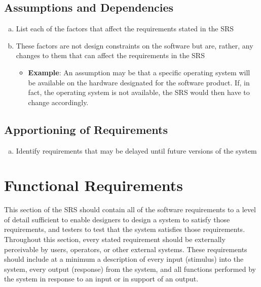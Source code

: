 \documentclass[]{article}
\begin{document}
\subsection{Assumptions and Dependencies}
\label{sub:assumptions_and_dependencies}
\begin{enumerate}[a)]
	\item List each of the factors that affect the requirements stated in the SRS
	\item These factors are not design constraints on the software but are, rather, any changes to them that can affect the requirements in the SRS
	\begin{itemize}
		\item \textbf{Example}: An assumption may be that a specific operating system will be available on the hardware designated for the software product. If, in fact, the operating system is not available, the SRS would then have to change accordingly.
	\end{itemize}
\end{enumerate}

\subsection{Apportioning of Requirements}
\label{sub:apportioning_of_requirements}
\begin{enumerate}[a)]
	\item Identify requirements that may be delayed until future versions of the system
\end{enumerate}


\section{Functional Requirements}
\label{sec:functional_requirements}
This section of the SRS should contain all of the software requirements to a level of detail sufficient to enable designers to design a system to satisfy those requirements, and testers to test that the system satisfies those requirements. Throughout this section, every stated requirement should be externally perceivable by users, operators, or other external systems. These requirements should include at a minimum a description of every input (stimulus) into the system, every output (response) from the system, and all functions performed by the system in response to an input or in support of an output.
\end{document}
